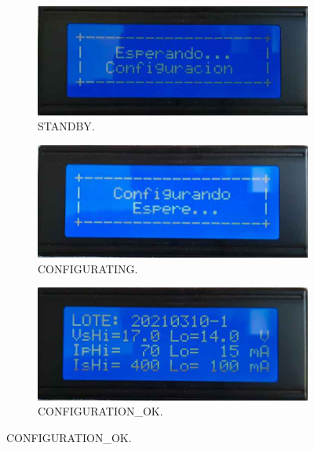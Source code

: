 \begin{figure}[!htpb]
     \centering
     \begin{subfigure}[b]{0.4\textwidth}
         \centering
         \includegraphics[width=1.1\textwidth]{./Figures/Esp_Conf.jpeg}
         \caption{STANDBY.}
         \label{fig:pruConf_7_1}
     \end{subfigure}
           \hfill
     \begin{subfigure}[b]{0.4\textwidth}
         \centering
         \includegraphics[width=1.1\textwidth]{./Figures/Conf_esp.jpeg}
         \caption{CONFIGURATING.}
         \label{fig:pruConf_7_2}
     \end{subfigure}
           \hfill
     \begin{subfigure}[b]{0.4\textwidth}
         \centering
         \includegraphics[width=1.1\textwidth]{./Figures/pru_fail.jpeg}
         \caption{CONFIGURATION\_OK.}
         \label{fig:pruConf_7_3}
     \end{subfigure}

\end{figure}
